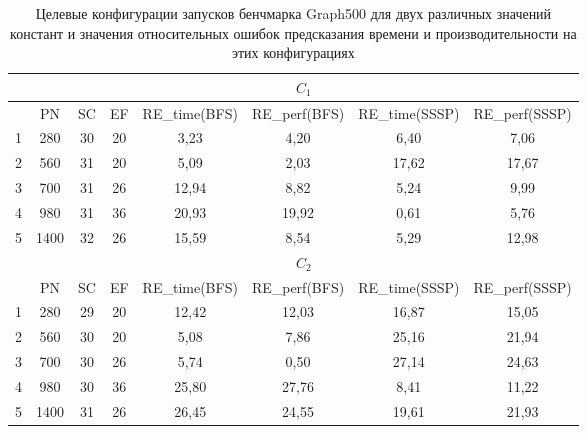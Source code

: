 		\begin{table}
			\centering
			\begin{tabular}{|r||c|c|c|c|c|c|c|}
				\hline
				            & \multicolumn{7}{c|}{\(C_1\)}                                                     \\ \hline
				            & PN   & SC & EF & RE\_time(BFS) & RE\_perf(BFS) & RE\_time(SSSP) & RE\_perf(SSSP) \\ \hline
				1           & 280  & 30 & 20 &          3,23 &          4,20 &           6,40 & 7,06           \\ \hline
				2           & 560  & 31 & 20 &          5,09 &          2,03 &          17,62 & 17,67          \\ \hline
				3           & 700  & 31 & 26 &         12,94 &          8,82 &           5,24 & 9,99           \\ \hline
				4           & 980  & 31 & 36 &         20,93 &         19,92 &           0,61 & 5,76           \\ \hline
				5           & 1400 & 32 & 26 &         15,59 &          8,54 &           5,29 & 12,98          \\ \hhline{|=||=|=|=|=|=|=|=|} 
				            & \multicolumn{7}{c|}{\(C_2\)}                                                     \\ \hline
				\textnumero & PN   & SC & EF & RE\_time(BFS) & RE\_perf(BFS) & RE\_time(SSSP) & RE\_perf(SSSP) \\ \hline
				1           & 280  & 29 & 20 &         12,42 &         12,03 &          16,87 & 15,05          \\ \hline
				2           & 560  & 30 & 20 &          5,08 &          7,86 &          25,16 & 21,94          \\ \hline  
				3           & 700  & 30 & 26 &          5,74 &          0,50 &          27,14 & 24,63          \\ \hline
				4           & 980  & 30 & 36 &         25,80 &         27,76 &           8,41 & 11,22          \\ \hline
				5           & 1400 & 31 & 26 &         26,45 &         24,55 &          19,61 & 21,93          \\ \hline              
			\end{tabular}
			\caption{Целевые конфигурации запусков бенчмарка Graph500 для двух различных значений констант и значения относительных ошибок предсказания времени и производительности на этих конфигурациях}
			\label{targer_Graph500}
		\end{table}
